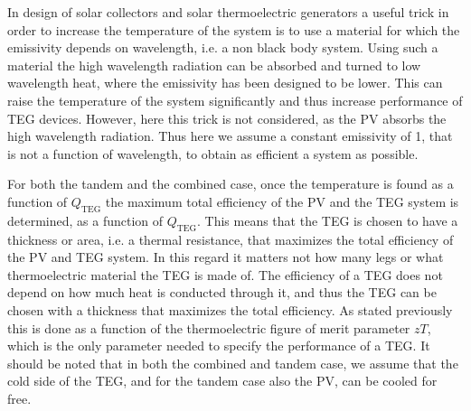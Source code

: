 \documentclass[fleqn,10pt]{SelfArx} %
\newcommand{\n}[1]{\mathrm{#1}}
\begin{document}
In design of solar collectors and solar thermoelectric generators a useful trick in order to increase the temperature of the system is to use a material for which the emissivity depends on wavelength, i.e. a non black body system. Using such a material the high wavelength radiation can be absorbed and turned to low wavelength heat, where the emissivity has been designed to be lower. This can raise the temperature of the system significantly and thus increase performance of TEG devices. However, here this trick is not considered, as the PV absorbs the high wavelength radiation. Thus here we assume a constant emissivity of 1, that is not a function of wavelength, to obtain as efficient a system as possible.

For both the tandem and the combined case, once the temperature is found as a function of $Q_\n{TEG}$ the maximum total efficiency of the PV and the TEG system is determined, as a function of $Q_\n{TEG}$. This means that the TEG is chosen to have a thickness or area, i.e. a thermal resistance, that maximizes the total efficiency of the PV and TEG system. In this regard it matters not how many legs or what thermoelectric material the TEG is made of. The efficiency of a TEG does not depend on how much heat is conducted through it, and thus the TEG can be chosen with a thickness that maximizes the total efficiency. As stated previously this is done as a function of the thermoelectric figure of merit parameter $zT$, which is the only parameter needed to specify the performance of a TEG.
It should be noted that in both the combined and tandem case, we assume that the cold side of the TEG, and for the tandem case also the PV, can be cooled for free.
\end{document}
